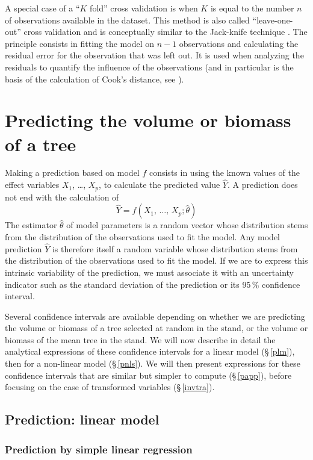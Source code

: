 A special case of a ``$K$ fold'' cross validation is when $K$ is equal to the number $n$ of observations available in the dataset. This method is also called ``leave-one-out'' cross validation and is conceptually similar to the Jack-knife technique \citep{efron93}. The principle consists in fitting the model on $n-1$ observations and calculating the residual error for the observation that was left out. It is used when analyzing the residuals to quantify the influence of the observations (and in particular is the basis of the calculation of Cook's distance, see \citealp{saporta90}).

\section{Predicting the volume or biomass of a tree\label{BVpred}}

Making a prediction based on model $f$ consists in using the known values of the effect variables $X_1$, \ldots,
$X_p$, to calculate the predicted value $\hat{Y}$. A prediction does not end with the calculation of
\[
\hat{Y}=f(X_1,\,\ldots,\,X_p;\hat{\theta})
\]
The estimator $\hat{\theta}$ of model parameters is a random vector whose distribution stems from the distribution of the observations used to fit the model. Any model prediction $\hat{Y}$ is therefore itself a random variable whose distribution stems from the distribution of the observations used to fit the model. If we are to express this intrinsic variability of the prediction, we must associate it with an uncertainty indicator such as the standard deviation of the prediction or its 95\,\% confidence interval.

Several confidence intervals are available depending on whether we are predicting the volume or biomass of a tree selected at random in the stand, or the volume or biomass of the mean tree in the stand. We will now describe in detail the analytical expressions of these confidence intervals for a linear model (\S\,\ref{plm}), then for a non-linear model (\S\,\ref{pnls}). We will then present expressions for these confidence intervals that are similar but simpler to compute (\S\,\ref{papp}), before focusing on the case of transformed variables (\S\,\ref{invtra}).

\subsection{Prediction: linear model\label{plm}}

\subsubsection{Prediction by simple linear regression}

